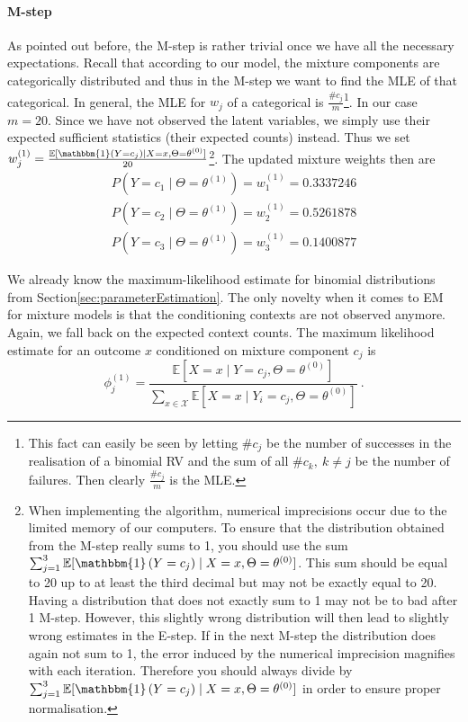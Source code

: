 \documentclass[a4paper,11pt,leqno]{report}\usepackage[]{graphicx}\usepackage[]{color}
\newcommand{\E}{\mathbb{E}}
\newcommand{\id}[1]{\mathbbm{1}\left(#1\right)}
\begin{document}
\paragraph{M-step} As pointed out before, the M-step is rather trivial once we have all the necessary expectations. Recall that according to our model, 
the mixture components are categorically
distributed and thus in the M-step we want to find the MLE of that categorical. In general, the MLE for $ w_{j} $ of a categorical is
$ \frac{\#c_{j}}{m} $\footnote{This fact can easily be seen by letting $ \#c_{j} $ be the number of successes in the realisation of a binomial RV and the sum of all
$ \#c_{k},~k \not = j $ be the number of failures. Then clearly $ \frac{\#c_{j}}{m} $ is the MLE.}. In our case $ m=20 $. Since we have not observed the
latent variables, we simply use their expected sufficient statistics (their expected counts) instead. Thus we set 
$ w_{j}^{(1)} = \frac{\E[\id{Y = c_{j}} \mid X=x,\Theta= \theta^{(0)}]}{20} $\footnote{When implementing the algorithm, numerical imprecisions occur due to the limited
memory of our computers. To ensure that the distribution obtained from the M-step really sums to 1, you should use the sum 
$ \sum_{j=1}^{3} \E[\id{Y = c_{j}} \mid X=x,\Theta= \theta^{(0)}] $. This sum should be equal to 20 up to at least the third decimal but may not be exactly equal to
20. Having a distribution that does not exactly sum to 1 may not be to bad after 1 M-step. However, this slightly wrong distribution will then lead to slightly wrong estimates in the E-step. If in the next M-step the distribution does again not sum to 1, the error induced by the numerical imprecision magnifies with each iteration. Therefore you should always divide by $ \sum_{j=1}^{3} \E[\id{Y = c_{j}} \mid X=x,\Theta= \theta^{(0)}] $ in order to ensure proper normalisation.}. The updated mixture weights then are 
\begin{align}
P(Y=c_{1} \mid \Theta= \theta^{(1)}) = w_{1}^{(1)}= 0.3337246 \\
P(Y=c_{2} \mid \Theta= \theta^{(1)}) = w_{2}^{(1)}= 0.5261878 \nonumber \\
P(Y=c_{3} \mid \Theta= \theta^{(1)}) = w_{3}^{(1)}= 0.1400877 \nonumber
\end{align}

We already know the maximum-likelihood estimate for binomial distributions from 
Section\ref{sec:parameterEstimation}. The only novelty when it comes to EM for mixture models
is that the conditioning contexts are not observed anymore. Again, we fall back on the expected
context counts. The maximum likelihood estimate for an outcome $ x $ conditioned on
mixture component $ c_{j} $ is
\begin{equation}
\phi^{(1)}_{j} = \frac{\E[X=x \mid Y=c_{j},\Theta=\theta^{(0)}]}{\sum_{x \in \mathcal{X}}\E[X=x \mid Y_{i}=c_{j},\Theta=\theta^{(0)}]}\ .
\end{equation}
\end{document}
